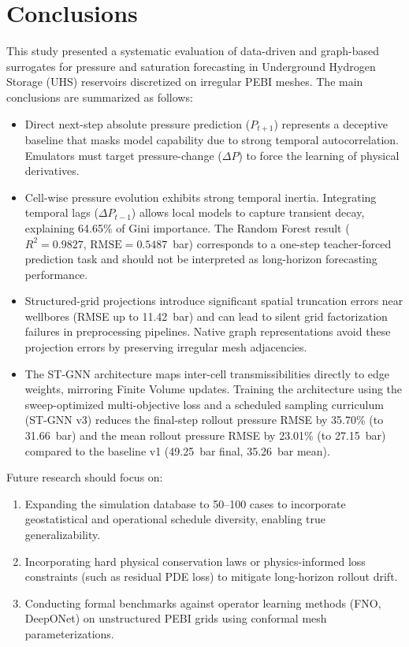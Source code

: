 \section{Conclusions}
This study presented a systematic evaluation of data-driven and graph-based surrogates for pressure and saturation forecasting in Underground Hydrogen Storage (UHS) reservoirs discretized on irregular PEBI meshes. The main conclusions are summarized as follows:
\begin{itemize}
    \item Direct next-step absolute pressure prediction ($P_{t+1}$) represents a deceptive baseline that masks model capability due to strong temporal autocorrelation. Emulators must target pressure-change ($\Delta P$) to force the learning of physical derivatives.
    \item Cell-wise pressure evolution exhibits strong temporal inertia. Integrating temporal lags ($\Delta P_{t-1}$) allows local models to capture transient decay, explaining 64.65\% of Gini importance. The Random Forest result ($R^2 = 0.9827$, $\text{RMSE} = 0.5487$~bar) corresponds to a one-step teacher-forced prediction task and should not be interpreted as long-horizon forecasting performance.
    \item Structured-grid projections introduce significant spatial truncation errors near wellbores (RMSE up to 11.42~bar) and can lead to silent grid factorization failures in preprocessing pipelines. Native graph representations avoid these projection errors by preserving irregular mesh adjacencies.
    \item The ST-GNN architecture maps inter-cell transmissibilities directly to edge weights, mirroring Finite Volume updates. Training the architecture using the sweep-optimized multi-objective loss and a scheduled sampling curriculum (ST-GNN v3) reduces the final-step rollout pressure RMSE by 35.70\% (to 31.66~bar) and the mean rollout pressure RMSE by 23.01\% (to 27.15~bar) compared to the baseline v1 (49.25~bar final, 35.26~bar mean).
\end{itemize}

Future research should focus on:
\begin{enumerate}
    \item Expanding the simulation database to 50--100 cases to incorporate geostatistical and operational schedule diversity, enabling true generalizability.
    \item Incorporating hard physical conservation laws or physics-informed loss constraints (such as residual PDE loss) to mitigate long-horizon rollout drift.
    \item Conducting formal benchmarks against operator learning methods (FNO, DeepONet) on unstructured PEBI grids using conformal mesh parameterizations.
\end{enumerate}
